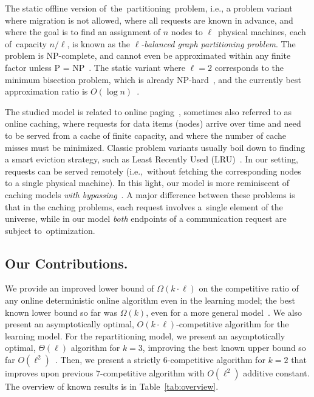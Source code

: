 \documentclass[manuscript,screen=true, review, anonymous]{acmart}
\begin{document}
The static offline version of~the~partitioning~problem, i.e., a problem variant where
migration is not allowed, where all requests are known in advance, and where
the goal is to find an assignment of $n$ nodes to $\ell$~physical machines, each of~capacity $n/\ell$, is known as the
\emph{$\ell$-balanced graph partitioning problem}. The problem is 
NP-complete, and cannot even be approximated within any finite factor unless P
= NP~\cite{AndRae06}.  The static
variant where $\ell = 2$ corresponds to the minimum bisection problem, which
is already NP-hard~\cite{GaJoSt76}, and 
the currently best approximation ratio is $O(\log n)$~\cite{SarVaz95,ArKaKa99,FeKrNi00,FeiKra02,KraFei06,Raec08}.

The studied model is related to online
paging~\cite{SleTar85,FKLMSY91,McGSle91,AcChNo00}, sometimes also referred to
as online caching, where requests for data items (nodes) arrive over time and
need to be served from a cache of finite capacity, and where the number of
cache misses must be minimized. Classic problem variants usually boil down to
finding a smart eviction strategy, such as Least Recently Used (LRU)~\cite{SleTar85}. In our
setting, requests can be served remotely (i.e.,~without fetching the
corresponding nodes to a single physical machine). In this light, our model is more
reminiscent of caching models \emph{with
bypassing}~\cite{EpImLN11,EpImLN15,Irani02}.
A major difference between  these problems is that in the caching problems, each request involves a~single element of the universe, while in our model \emph{both} endpoints of a communication request are subject to~optimization.


\subsection{Our Contributions.}
We provide an improved lower bound 
of $\Omega(k\cdot\ell)$ on the competitive ratio of any online deterministic online algorithm 
even in the learning model;
the best known lower bound so far was $\Omega(k)$,
even for a more general model~\cite{repartition-disc}.
We also present an asymptotically optimal, 
$O(k\cdot \ell)$-competitive algorithm
for the learning model.
For the repartitioning model, we present  
an asymptotically optimal,
$\Theta(\ell)$ algorithm for $k=3$, improving the best known upper bound 
so far $O(\ell^2)$~\cite{repartition-disc}.
Then, we present a strictly $6$-competitive algorithm for $k=2$ that improves upon previous $7$-competitive algorithm with $O(\ell^2)$ additive constant.
%
The overview of known results is in Table~\ref{tab:overview}.
\end{document}
